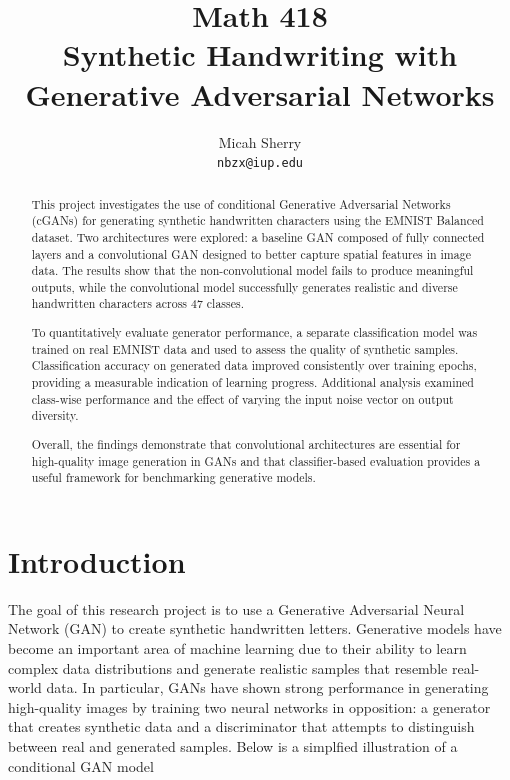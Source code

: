 \documentclass[titlepage]{article}
\title{Math 418\\ \large Synthetic Handwriting with Generative Adversarial Networks}
\author{
    Micah Sherry \\
    \texttt{nbzx@iup.edu}
}
\begin{document}
\maketitle
\begin{abstract}
    This project investigates the use of conditional Generative Adversarial Networks (cGANs) for generating synthetic handwritten characters using the EMNIST Balanced dataset. Two architectures were explored: a baseline GAN composed of fully connected layers and a convolutional GAN designed to better capture spatial features in image data. The results show that the non-convolutional model fails to produce meaningful outputs, while the convolutional model successfully generates realistic and diverse handwritten characters across 47 classes.
    
    To quantitatively evaluate generator performance, a separate classification model was trained on real EMNIST data and used to assess the quality of synthetic samples. Classification accuracy on generated data improved consistently over training epochs, providing a measurable indication of learning progress. Additional analysis examined class-wise performance and the effect of varying the input noise vector on output diversity.
    
    Overall, the findings demonstrate that convolutional architectures are essential for high-quality image generation in GANs and that classifier-based evaluation provides a useful framework for benchmarking generative models.
\end{abstract}

\section{Introduction}

The goal of this research project is to use a Generative Adversarial Neural Network (GAN) \cite{cGAN} to create synthetic handwritten letters.
Generative models have become an important area of machine learning due to their ability to learn complex data distributions and generate realistic samples that resemble real-world data.
In particular, GANs have shown strong performance in generating high-quality images by training two neural networks in opposition: a generator that creates synthetic data and a discriminator that attempts to distinguish between real and generated samples. Below is a simplfied illustration of a conditional GAN model
\end{document}
